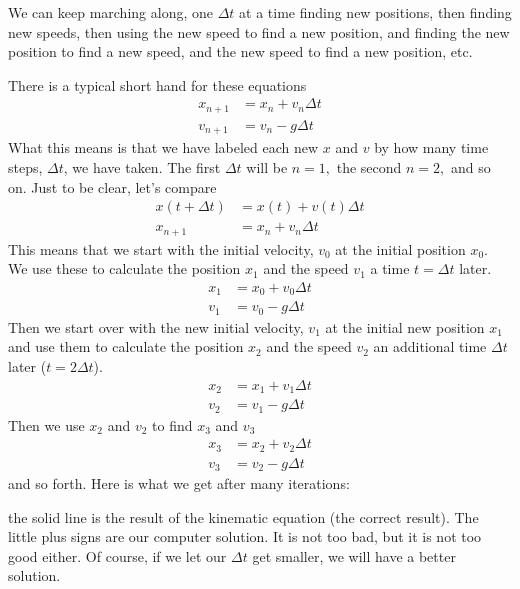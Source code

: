 \documentclass{book}
\begin{document}
We can keep marching along, one $\Delta t$ at a time finding new positions,
then finding new speeds, then using the new speed to find a new position, and
finding the new position to find a new speed, and the new speed to find a new
position, etc.

There is a typical short hand for these equations \begin{align*}
x_{n+1}  & =x_{n}+v_{n}\Delta t\\
v_{n+1}  & =v_{n}-g\Delta t
\end{align*}
What this means is that we have labeled each new $x$ and $v$ by how many time
steps, $\Delta t$, we have taken. The first $\Delta t$ will be $n=1,$ the
second $n=2,$ and so on. Just to be clear, let's compare \begin{align*}
x(t+\Delta t)  & =x(t)+v(t)\Delta t\\
x_{n+1}  & =x_{n}+v_{n}\Delta t
\end{align*}
This means that we start with the initial velocity, $v_{0}$ at the initial
position $x_{0}.$ We use these to calculate the position $x_{1}$ and the speed
$v_{1}$ a time $t=\Delta t$ later.
\begin{align*}
x_{1}  & =x_{0}+v_{0}\Delta t\\
v_{1}  & =v_{0}-g\Delta t
\end{align*}
Then we start over with the new initial velocity, $v_{1}$ at the initial new
position $x_{1}$ and use them to calculate the position $x_{2}$ and the speed
$v_{2}$ an additional time $\Delta t$ later ($t=2\Delta t$).
\begin{align*}
x_{2}  & =x_{1}+v_{1}\Delta t\\
v_{2}  & =v_{1}-g\Delta t
\end{align*}
Then we use $x_{2}$ and $v_{2}$ to find $x_{3}$ and $v_{3}$
\begin{align*}
x_{3}  & =x_{2}+v_{2}\Delta t\\
v_{3}  & =v_{2}-g\Delta t
\end{align*}
and so forth. Here is what we get after many iterations:


\begin{center}

\end{center}
the solid line is the result of the kinematic equation (the correct result).
The little plus signs are our computer solution. It is not too bad, but it is
not too good either. Of course, if we let our $\Delta t$ get smaller, we will
have a better solution.
\end{document}
